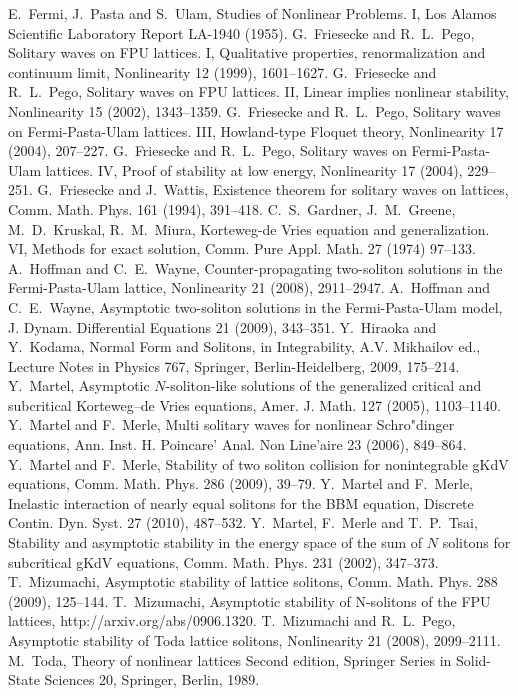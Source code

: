 \documentclass[11pt]{amsart}
\theoremstyle{remark}
\numberwithin{equation}{section}
\begin{document}
\begin{thebibliography}{10}
 {\sc E.~Fermi, J.~Pasta and S.~Ulam},
Studies of Nonlinear Problems. I,
Los Alamos Scientific Laboratory Report LA-1940 (1955).
 {\sc G.~Friesecke and R.~L.~Pego},
Solitary waves on FPU lattices. I, Qualitative properties, renormalization and
continuum limit, Nonlinearity 12 (1999), 1601--1627.
 {\sc G.~Friesecke and R.~L.~Pego},
Solitary waves on FPU lattices. II, Linear implies nonlinear stability,
Nonlinearity 15 (2002), 1343--1359.
 {\sc G.~Friesecke and R.~L.~Pego},
Solitary waves on Fermi-Pasta-Ulam lattices. III,
Howland-type Floquet theory, Nonlinearity 17 (2004), 207--227.
 {\sc G.~Friesecke and R.~L.~Pego},
Solitary waves on Fermi-Pasta-Ulam lattices. IV,
Proof of stability at low energy, Nonlinearity 17 (2004), 229--251.
 {\sc G.~Friesecke and J.~Wattis},
Existence theorem for solitary waves on lattices,
Comm. Math. Phys. 161 (1994), 391--418.
 {\sc C.~S.~Gardner, J.~M.~Greene, M.~D.~Kruskal,
R.~M.~Miura}, Korteweg-de Vries equation and generalization. VI,
Methods for exact solution, Comm. Pure Appl. Math. 27 (1974)  97--133.
 {\sc A.~Hoffman and C.~E.~Wayne},
Counter-propagating two-soliton solutions in the Fermi-Pasta-Ulam lattice,
Nonlinearity  21 (2008),  2911--2947.
 {\sc A.~Hoffman and C.~E.~Wayne},
Asymptotic two-soliton solutions in the Fermi-Pasta-Ulam model,
J. Dynam. Differential Equations  21  (2009), 343--351.
 {\sc Y.~Hiraoka and Y.~Kodama},
Normal Form and Solitons, in Integrability,
A.V. Mikhailov ed., Lecture Notes in Physics 767, Springer,
Berlin-Heidelberg, 2009, 175--214.
 {\sc Y.~Martel}, Asymptotic $N$-soliton-like solutions of the
generalized critical and subcritical Korteweg--de Vries equations,
Amer. J. Math. 127 (2005), 1103--1140.
  {\sc Y.~Martel and F.~Merle},
Multi solitary waves for nonlinear Schro"dinger equations,
Ann. Inst. H. Poincare' Anal. Non Line'aire  23  (2006), 849--864.
  {\sc Y.~Martel and F.~Merle},
Stability of two soliton collision for nonintegrable gKdV equations,
Comm. Math. Phys. 286 (2009), 39--79.
 {\sc Y.~Martel and F.~Merle},
Inelastic interaction of nearly equal solitons for the BBM equation,
Discrete Contin. Dyn. Syst. 27 (2010), 487--532.
 {\sc Y.~Martel, F.~Merle and T.~P.~Tsai},
Stability and asymptotic stability in the energy space of the sum of
$N$ solitons for subcritical gKdV equations, Comm. Math. Phys. 231 (2002),
347--373. 
 {\sc T.~Mizumachi},
Asymptotic stability of lattice solitons, Comm. Math. Phys. 288 (2009),
125--144.
 {\sc T.~Mizumachi},
Asymptotic stability of N-solitons of the FPU lattices,
http://arxiv.org/abs/0906.1320.
 {\sc T.~Mizumachi and R.~L.~Pego},
Asymptotic stability of Toda lattice solitons,  Nonlinearity  21 (2008),
2099--2111.
 {\sc M.~Toda},
Theory of nonlinear lattices  Second edition,
Springer Series in Solid-State Sciences 20, Springer, Berlin, 1989. 
\end{thebibliography}
\end{document}

